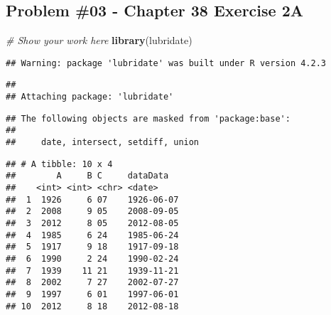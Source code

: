 \documentclass[
]{article}
\newenvironment{Shaded}{\begin{snugshade}}{\end{snugshade}}
\newcommand{\AttributeTok}[1]{\textcolor[rgb]{0.13,0.29,0.53}{#1}}
\newcommand{\CommentTok}[1]{\textcolor[rgb]{0.56,0.35,0.01}{\textit{#1}}}
\newcommand{\FunctionTok}[1]{\textcolor[rgb]{0.13,0.29,0.53}{\textbf{#1}}}
\newcommand{\NormalTok}[1]{#1}
\newcommand{\OtherTok}[1]{\textcolor[rgb]{0.56,0.35,0.01}{#1}}
\newcommand{\SpecialCharTok}[1]{\textcolor[rgb]{0.81,0.36,0.00}{\textbf{#1}}}
\begin{document}
\newpage

\hypertarget{problem-03---chapter-38-exercise-2a}{%
\subsection{Problem \#03 - Chapter 38 Exercise
2A}\label{problem-03---chapter-38-exercise-2a}}

\begin{Shaded}
\begin{Highlighting}[]
\CommentTok{\# Show your work here}
\FunctionTok{library}\NormalTok{(lubridate)}
\end{Highlighting}
\end{Shaded}

\begin{verbatim}
## Warning: package 'lubridate' was built under R version 4.2.3
\end{verbatim}

\begin{verbatim}
## 
## Attaching package: 'lubridate'
\end{verbatim}

\begin{verbatim}
## The following objects are masked from 'package:base':
## 
##     date, intersect, setdiff, union
\end{verbatim}

\begin{Shaded}
\end{Shaded}

\begin{verbatim}
## # A tibble: 10 x 4
##        A     B C     dataData  
##    <int> <int> <chr> <date>    
##  1  1926     6 07    1926-06-07
##  2  2008     9 05    2008-09-05
##  3  2012     8 05    2012-08-05
##  4  1985     6 24    1985-06-24
##  5  1917     9 18    1917-09-18
##  6  1990     2 24    1990-02-24
##  7  1939    11 21    1939-11-21
##  8  2002     7 27    2002-07-27
##  9  1997     6 01    1997-06-01
## 10  2012     8 18    2012-08-18
\end{verbatim}
\end{document}
